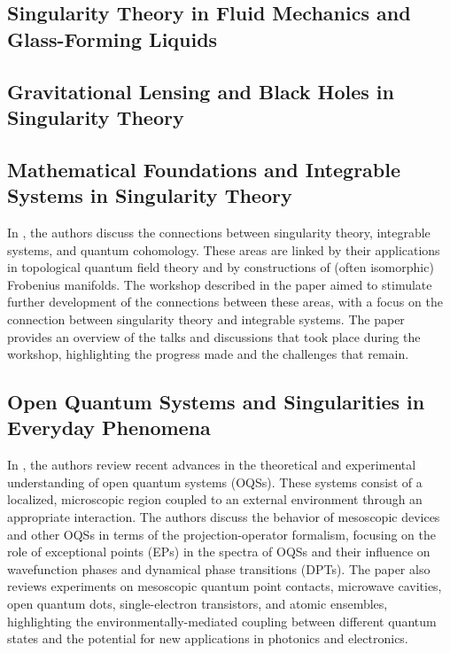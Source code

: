 \documentclass{article}
\begin{document}
\subsection{Singularity Theory in Fluid Mechanics and Glass-Forming Liquids}

\subsection{Gravitational Lensing and Black Holes in Singularity Theory}

\subsection{Mathematical Foundations and Integrable Systems in Singularity Theory}

In \cite{Dubrovin2012SingularityTA}, the authors discuss the connections between singularity theory, integrable systems, and quantum cohomology. These areas are linked by their applications in topological quantum field theory and by constructions of (often isomorphic) Frobenius manifolds. The workshop described in the paper aimed to stimulate further development of the connections between these areas, with a focus on the connection between singularity theory and integrable systems. The paper provides an overview of the talks and discussions that took place during the workshop, highlighting the progress made and the challenges that remain.

\subsection{Open Quantum Systems and Singularities in Everyday Phenomena}

In \cite{Rotter2015ARO}, the authors review recent advances in the theoretical and experimental understanding of open quantum systems (OQSs). These systems consist of a localized, microscopic region coupled to an external environment through an appropriate interaction. The authors discuss the behavior of mesoscopic devices and other OQSs in terms of the projection-operator formalism, focusing on the role of exceptional points (EPs) in the spectra of OQSs and their influence on wavefunction phases and dynamical phase transitions (DPTs). The paper also reviews experiments on mesoscopic quantum point contacts, microwave cavities, open quantum dots, single-electron transistors, and atomic ensembles, highlighting the environmentally-mediated coupling between different quantum states and the potential for new applications in photonics and electronics.
\end{document}
